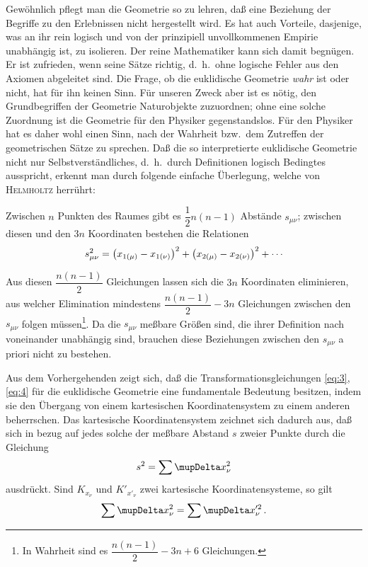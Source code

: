 Gewöhnlich pflegt man die Geometrie so zu lehren, daß eine Beziehung der 
Begriffe zu den Erlebnissen nicht hergestellt wird. Es hat auch Vorteile, 
dasjenige, was an ihr rein logisch und von der prinzipiell unvollkommenen 
Empirie unabhängig ist, zu isolieren. Der reine Mathematiker kann sich damit 
begnügen. Er ist zufrieden, wenn seine Sätze richtig, d.\ h.\ ohne logische
Fehler aus den Axiomen abgeleitet sind. Die Frage, ob die euklidische 
Geometrie \emph{wahr} ist oder nicht, hat für ihn keinen Sinn. Für unseren 
Zweck aber ist es nötig, den Grundbegriffen der Geometrie Naturobjekte 
zuzuordnen; ohne eine solche Zuordnung ist die Geometrie für den Physiker 
gegenstandslos. Für den Physiker hat es daher wohl einen Sinn, nach der 
Wahrheit bzw.\ dem Zutreffen der geometrischen Sätze zu sprechen. Daß die so 
interpretierte euklidische Geometrie nicht nur Selbstverständliches, d.\ h.\ 
durch Definitionen logisch Bedingtes ausspricht, erkennt man durch folgende 
einfache Überlegung, welche von \textsc{Helmholtz} herrührt:

Zwischen $n$ Punkten des Raumes gibt es $\dfrac{1}{2} n(n-1)$ Abstände 
$s_{\mu\nu}$; zwischen diesen und den $3n$ Koordinaten bestehen die Relationen
\begin{align*}
s_{\mu\nu}^2 = {\left(x_{1(\mu)} - x_{1(\nu)}\right)}^2 +
	{\left(x_{2(\mu)} - x_{2(\nu)}\right)}^2 + \cdots
\end{align*}

Aus diesen $\dfrac{n(n-1)}{2}$ Gleichungen lassen sich die $3n$ Koordinaten
eliminieren, aus welcher Elimination mindestens $\dfrac{n(n-1)}{2} - 3n$ 
Gleichungen zwischen den $s_{\mu\nu}$ folgen müssen\footnote{In Wahrheit sind 
es $\dfrac{n(n-1)}{2} - 3n + 6$ Gleichungen.}. Da die $s_{\mu\nu}$ meßbare 
Größen sind, die ihrer Definition nach voneinander unabhängig sind, brauchen 
diese Beziehungen zwischen den $s_{\mu\nu}$ a priori nicht zu bestehen.

Aus dem Vorhergehenden zeigt sich, daß die Transformationsgleichungen 
\eqref{eq:3}, \eqref{eq:4} für die euklidische Geometrie eine fundamentale 
Bedeutung besitzen, indem sie den Übergang von einem kartesischen 
Koordinatensystem zu einem anderen beherrschen. Das kartesische 
Koordinatensystem zeichnet sich dadurch aus, daß sich in bezug auf jedes solche 
der meßbare Abstand $s$ zweier Punkte durch die Gleichung
\begin{align*}
s^2 = \sum \Dva x_{\nu}^2
\end{align*}
ausdrückt. Sind $K_{x_{\nu}}$ und $K'_{x'_{\nu}}$ zwei kartesische 
Koordinatensysteme, so gilt
\begin{align*}
\sum \Dva x_{\nu}^2 = \sum \Dva x^{\prime 2}_{\nu}\,.
\end{align*}

